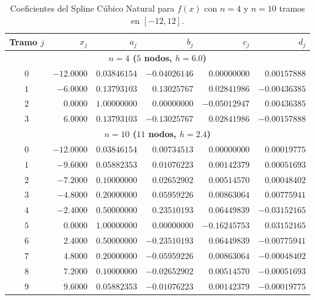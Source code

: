 \documentclass[11pt,letterpaper]{article}
\begin{document}
\begin{table}[H]
    \centering
    \caption{Coeficientes del Spline Cúbico Natural para $f(x)$ con $n = 4$ y $n = 10$ tramos en $[-12, 12]$.}
    \label{tab:p3_fx}
    \small
    \begin{tabular}{c|rrrrr}
        \toprule
        Tramo $j$ & $x_j$ & $a_j$ & $b_j$ & $c_j$ & $d_j$ \\
        \midrule
        \multicolumn{6}{c}{\textbf{$n = 4$ ($5$ nodos, $h = 6.0$)}} \\
        \midrule
        $0$ & $-12.0000$ & $0.03846154$ & $-0.04026146$ & $0.00000000$ & $0.00157888$ \\
        $1$ & $-6.0000$  & $0.13793103$ & $0.13025767$  & $0.02841986$ & $-0.00436385$ \\
        $2$ & $0.0000$   & $1.00000000$ & $0.00000000$  & $-0.05012947$ & $0.00436385$ \\
        $3$ & $6.0000$   & $0.13793103$ & $-0.13025767$ & $0.02841986$ & $-0.00157888$ \\
        \midrule
        \multicolumn{6}{c}{\textbf{$n = 10$ ($11$ nodos, $h = 2.4$)}} \\
        \midrule
        $0$ & $-12.0000$ & $0.03846154$ & $0.00734513$  & $0.00000000$  & $0.00019775$ \\
        $1$ & $-9.6000$  & $0.05882353$ & $0.01076223$  & $0.00142379$  & $0.00051693$ \\
        $2$ & $-7.2000$  & $0.10000000$ & $0.02652902$  & $0.00514570$  & $0.00048402$ \\
        $3$ & $-4.8000$  & $0.20000000$ & $0.05959226$  & $0.00863064$  & $0.00775941$ \\
        $4$ & $-2.4000$  & $0.50000000$ & $0.23510193$  & $0.06449839$  & $-0.03152165$ \\
        $5$ & $0.0000$   & $1.00000000$ & $0.00000000$  & $-0.16245753$ & $0.03152165$ \\
        $6$ & $2.4000$   & $0.50000000$ & $-0.23510193$ & $0.06449839$  & $-0.00775941$ \\
        $7$ & $4.8000$   & $0.20000000$ & $-0.05959226$ & $0.00863064$  & $-0.00048402$ \\
        $8$ & $7.2000$   & $0.10000000$ & $-0.02652902$ & $0.00514570$  & $-0.00051693$ \\
        $9$ & $9.6000$   & $0.05882353$ & $-0.01076223$ & $0.00142379$  & $-0.00019775$ \\
        \bottomrule
    \end{tabular}
\end{table}
\end{document}
